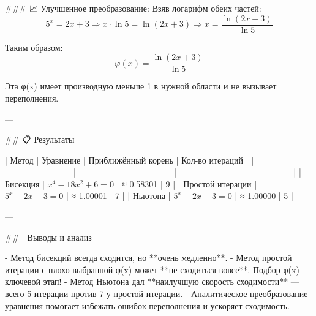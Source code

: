 ### 📈 Улучшенное преобразование:
Взяв логарифм обеих частей:
\[
5^x = 2x + 3 \Rightarrow x \cdot \ln 5 = \ln(2x + 3)
\Rightarrow x = \frac{\ln(2x + 3)}{\ln 5}
\]

Таким образом:
\[
\varphi(x) = \frac{\ln(2x + 3)}{\ln 5}
\]

Эта φ(x) имеет производную меньше 1 в нужной области и не вызывает переполнения.

---

## 📋 Результаты

| Метод                  | Уравнение                         | Приближённый корень | Кол-во итераций |
|------------------------|-----------------------------------|----------------------|------------------|
| Бисекция               | \( x^4 - 18x^2 + 6 = 0 \)         | ≈ 0.58301            | 9                |
| Простой итерации       | \( 5^x - 2x - 3 = 0 \)            | ≈ 1.00001            | 7                |
| Ньютона                | \( 5^x - 2x - 3 = 0 \)            | ≈ 1.00000            | 5                |

---

## 🧠 Выводы и анализ

- Метод бисекций всегда сходится, но **очень медленно**.
- Метод простой итерации с плохо выбранной φ(x) может **не сходиться вовсе**. Подбор φ(x) — ключевой этап!
- Метод Ньютона дал **наилучшую скорость сходимости** — всего 5 итерации против 7 у простой итерации.
- Аналитическое преобразование уравнения помогает избежать ошибок переполнения и ускоряет сходимость.